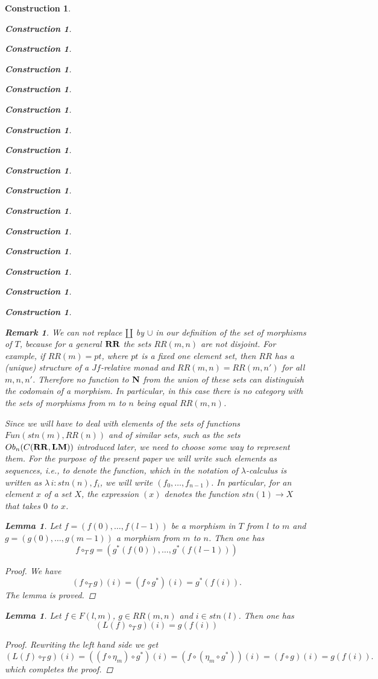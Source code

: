 \documentclass[12pt]{amsart}
\newenvironment{eq}{\begin{equation}}{\end{equation}}
\newtheorem{lemma}[proposition]{Lemma}
\newtheorem{remark}[proposition]{Remark}
\newtheorem{construction}[proposition]{Construction}
\newcommand{\llabel}[1]{\label{#1}}
\renewcommand{\comment}[1]{}
\newcommand{\sr}{\rightarrow}
\newcommand{\nn}{{\bf N\rm}}
\newcommand{\nat}{\nn}
\newcommand{\mbind}[1]{{#1^*}}
\newcommand{\hc}{\circ_{T}}
\newcommand{\RR}{{\bf RR}}
\newcommand{\LM}{{\bf LM}}
\begin{document}
\begin{construction}
\begin{construction}
\begin{construction}
\begin{construction}
\begin{construction}
\begin{construction}
\begin{construction}
\begin{construction}
\begin{construction}
\begin{construction}
\begin{construction}
\begin{construction}
\begin{construction}
\begin{construction}
\begin{construction}
\begin{construction}
\comment{Similarly, we will use the functions $\mbind{m}$ as a coercions so
  that when an element $g$ of $RR(m,n)$ occurs in a position where a function
  from $RR(m)$ to $RR(n)$ is expected it has to be replaced by $\mbind{g}$. }
%
\begin{remark}\rm
\llabel{2015.11.20.rem4} 
We can not replace $\amalg$ by $\cup$ in our
definition of the set of morphisms of $T$, because for a general $\RR$ the sets
$RR(m,n)$ are not disjoint.  For example, if $RR(m)=pt$, where $pt$ is a fixed
one element set, then $RR$ has a (unique) structure of a $Jf$-relative monad and
$RR(m,n)=RR(m,n')$ for all $m,n,n'$. Therefore no function to $\nat$ from the
union of these sets can distinguish the codomain of a morphism. In particular,
in this case there is no category with the sets of morphisms from $m$ to $n$
being equal $RR(m,n)$.
\end{remark}
%
Since we will have to deal with elements of the sets of functions
$Fun(stn(m),RR(n))$ and of similar sets, such as the sets $Ob_n(C(\RR,\LM))$
introduced later, we need to choose some way to represent them. For the purpose
of the present paper we will write such elements as sequences, i.e., to denote
the function, which in the notation of $\lambda$-calculus is written as
$\lambda\,i:stn(n), f_i$, we will write $(f_0,\dots,f_{n-1})$. In particular,
for an element $x$ of a set $X$, the expression $(x)$ denotes the function
$stn(1)\sr X$ that takes $0$ to $x$.
%
\begin{lemma}
\llabel{2016.01.15.l4} 
Let $f=(f(0),\dots,f(l-1))$ be a morphism in $T$ from
$l$ to $m$ and $g=(g(0),\dots,g(m-1))$ a morphism from $m$ to $n$. Then one has
%
$$f\hc g=(\mbind{g}(f(0)),\dots,\mbind{g}(f(l-1)))$$
%
\end{lemma}
%
\begin{proof}
We have
%
$$(f\hc g)(i)=(f\circ\mbind{g})(i)=\mbind{g}(f(i)).$$
%
The lemma is proved. 
\end{proof}
%
\begin{lemma}
\llabel{2015.08.30.l1}
Let $f\in F(l,m)$, $g\in RR(m,n)$ and $i\in stn(l)$. Then one has
%
\begin{eq}\llabel{2015.08.26.eq4}
(L(f)\hc g)(i)=g(f(i))
\end{eq}%
% 
\end{lemma}
%
\begin{proof}
Rewriting the left hand side we get 
%
$$(L(f)\hc g)(i)=((f\circ \eta_{m})\circ \mbind{g})(i)=(f\circ (\eta_{m}\circ \mbind{g}))(i)=(f\circ g)(i)=g(f(i)).$$
%
which completes the proof. 
\end{proof}

\end{construction}
\end{construction}
\end{construction}
\end{construction}
\end{construction}
\end{construction}
\end{construction}
\end{construction}
\end{construction}
\end{construction}
\end{construction}
\end{construction}
\end{construction}
\end{construction}
\end{construction}
\end{construction}
\end{document}
